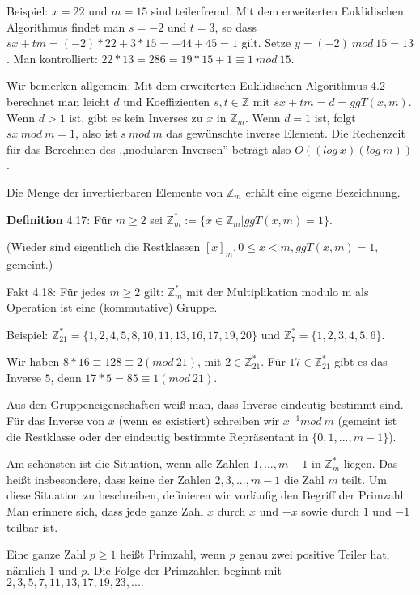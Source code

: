 \documentclass[a4paper]{article}
\begin{document}
\begin{multicols}{3}
    Beispiel: $x=22$ und $m=15$ sind teilerfremd. Mit dem erweiterten Euklidischen Algorithmus findet man $s=-2$ und $t=3$, so dass $sx+tm=(-2)*22 + 3*15 =-44 + 45 = 1$ gilt. Setze $y=(-2)\ mod\ 15 = 13$. Man kontrolliert: $22*13 =286=19 *15 + 1\equiv 1\ mod\ 15$.

    Wir bemerken allgemein: Mit dem erweiterten Euklidischen Algorithmus 4.2 berechnet man leicht $d$ und Koeffizienten $s,t\in\mathbb{Z}$ mit $sx+tm= d= ggT(x,m)$. Wenn $d>1$ ist, gibt es kein Inverses zu $x$ in $\mathbb{Z}_m$. Wenn $d=1$ ist, folgt $sx\ mod\ m=1$, also ist $s\ mod\ m$ das gewünschte inverse Element. Die Rechenzeit für das Berechnen des ,,modularen Inversen'' beträgt also $O((log\ x)(log\ m))$.

    Die Menge der invertierbaren Elemente von $\mathbb{Z}_m$ erhält eine eigene Bezeichnung.

    \textbf{Definition} 4.17: Für $m\geq 2$ sei $\mathbb{Z}^*_m:=\{x\in\mathbb{Z}_m| ggT(x,m)=1\}$.

    (Wieder sind eigentlich die Restklassen $[x]_m, 0\leq x < m, ggT(x,m) = 1$, gemeint.)

    Fakt 4.18: Für jedes $m\geq 2$ gilt: $\mathbb{Z}^*_m$ mit der Multiplikation modulo m als Operation ist eine (kommutative) Gruppe.

    Beispiel: $\mathbb{Z}^*_{21}=\{1,2,4,5,8,10,11,13,16,17,19,20\}$ und $\mathbb{Z}^*_7=\{1,2,3,4,5,6\}$.

    Wir haben $8*16 \equiv 128 \equiv 2 (mod\ 21)$, mit $2\in\mathbb{Z}^*_{21}$. Für $17\in\mathbb{Z}^*_{21}$ gibt es das Inverse $5$, denn $17*5 = 85\equiv 1 (mod\ 21)$.

    Aus den Gruppeneigenschaften weiß man, dass Inverse eindeutig bestimmt sind. Für das Inverse von $x$ (wenn es existiert) schreiben wir $x^{-1} mod\ m$ (gemeint ist die Restklasse oder der eindeutig bestimmte Repräsentant in $\{0,1 ,...,m-1\}$).

    Am schönsten ist die Situation, wenn alle Zahlen $1,...,m-1$ in $\mathbb{Z}^*_m$ liegen. Das heißt insbesondere, dass keine der Zahlen $2, 3 ,...,m-1$ die Zahl $m$ teilt. Um diese Situation zu beschreiben, definieren wir vorläufig den Begriff der Primzahl. Man erinnere sich, dass jede ganze Zahl $x$ durch $x$ und $-x$ sowie durch $1$ und $-1$ teilbar ist.

    Eine ganze Zahl $p\geq 1$ heißt Primzahl, wenn $p$ genau zwei positive Teiler hat, nämlich $1$ und $p$. Die Folge der Primzahlen beginnt mit $2, 3 , 5 , 7 , 11 , 13 , 17 , 19 , 23 ,....$


\end{multicols}
\end{document}
